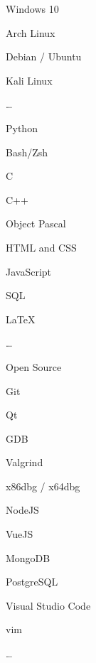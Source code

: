 \SmallSep

\begin{multicols}{3}
\begin{compactitem}[\color{Cyan}$\circ$]
	\item Windows 10
	\item Arch Linux
	\item Debian / Ubuntu
	\item Kali Linux
	\item \ldots
\end{compactitem}
\end{multicols}

\SmallSep

\begin{multicols}{3}
\begin{compactitem}[\color{Cyan}$\circ$]
    \item Python
    \item Bash/Zsh
	\item C
    \item C++
    \item Object Pascal
    \item HTML and CSS
    \item JavaScript
    \item SQL
    \item \LaTeX
	\item \ldots
\end{compactitem}
\end{multicols}

\SmallSep

\begin{multicols}{3}
\begin{compactitem}[\color{Cyan}$\circ$]
    \item Open Source \heart\
    \item Git
    \item Qt
    \item GDB
    \item Valgrind
    \item x86dbg / x64dbg
    \item NodeJS
    \item VueJS
    \item MongoDB
    \item PostgreSQL
    \item Visual Studio Code
    \item vim
    \item \ldots
\end{compactitem}
\end{multicols}

